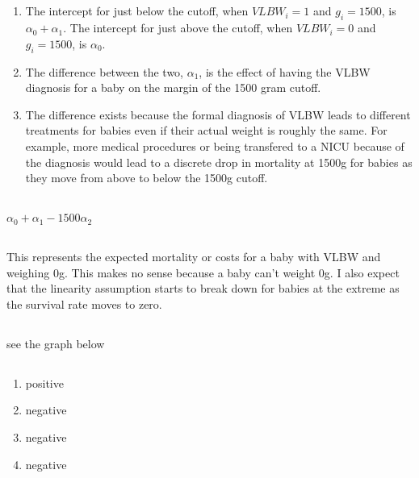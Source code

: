 \documentclass[11pt]{article}
\begin{document}
\subsection{}
  \renewcommand{\theenumi}{\roman{enumi}}
\begin{enumerate}
	\item The intercept for just below the cutoff, when $VLBW_i = 1$ and $g_i = 1500$, is $\alpha_0 + \alpha_1$. The intercept for just above the cutoff, when $VLBW_i = 0$ and $g_i = 1500$, is $\alpha_0$. 
	 
	 \item The difference between the two, $\alpha_1$, is the effect of having the VLBW diagnosis for a baby on the margin of the 1500 gram cutoff. 
	 
	 \item The difference exists because the formal diagnosis of VLBW leads to different treatments for babies even if their actual weight is roughly the same. For example, more medical procedures or being transfered to a NICU because of the diagnosis would lead to a discrete drop in mortality at 1500g for babies as they move from above to below the 1500g cutoff. 
\end{enumerate}

\subsection{}
$\alpha_0 + \alpha_1-1500\alpha_2$

\subsection{}
This represents the expected mortality or costs for a baby with VLBW  and weighing 0g. This makes no sense because a baby can't weight 0g. I also expect that the linearity assumption starts to break down for babies at the extreme as the survival rate moves to zero. 

\subsection{} 
see the graph below 
\newpage\subsection{}

  \renewcommand{\theenumi}{\roman{enumi}}
\begin{enumerate}
	\item positive 
	\item negative 
	\item negative 
	\item negative 
\end{enumerate}
\end{document}
